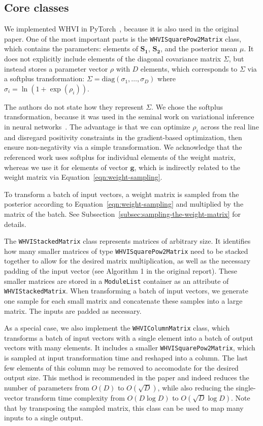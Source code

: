 \documentclass[11pt, twocolumn]{article}
\begin{document}
    \subsection{Core classes}\label{subsec:core-classes}
    We implemented WHVI in PyTorch~\cite{pytorch}, because it is also used in the original paper.
    One of the most important parts is the \texttt{WHVISquarePow2Matrix} class, which contains the parameters: elements of $\mathbf{S_1}$, $\mathbf{S_2}$, and the posterior mean $\mu$.
    It does not explicitly include elements of the diagonal covariance matrix $\Sigma$, but instead stores a parameter vector $\rho$ with $D$ elements, which corresponds to $\Sigma$ via a softplus transformation: $\Sigma = \mathrm{diag}(\sigma_1, \dots, \sigma_D)$ where $\sigma_i = \ln(1 + \exp(\rho_i))$.

    The authors do not state how they represent $\Sigma$.
    We chose the softplus transformation, because it was used in the seminal work on variational inference in neural networks~\cite{blundell2015weight}.
    The advantage is that we can optimize $\rho_i$ across the real line and disregard positivity constraints in the gradient-based optimization, then ensure non-negativity via a simple transformation.
    We acknowledge that the referenced work uses softplus for individual elements of the weight matrix, whereas we use it for elements of vector $\mathbf{g}$, which is indirectly related to the weight matrix via Equation~\ref{eqn:weight-sampling}.

    To transform a batch of input vectors, a weight matrix is sampled from the posterior according to Equation~\ref{eqn:weight-sampling} and multiplied by the matrix of the batch. See Subsection~\ref{subsec:sampling-the-weight-matrix} for details.

    The \texttt{WHVIStackedMatrix} class represents matrices of arbitrary size.
    It identifies how many smaller matrices of type \texttt{WHVISquarePow2Matrix} need to be stacked together to allow for the desired matrix multiplication, as well as the necessary padding of the input vector (see Algorithm 1 in the original report).
    These smaller matrices are stored in a \texttt{ModuleList} container as an attribute of \texttt{WHVIStackedMatrix}. When transforming a batch of input vectors, we generate one sample for each small matrix and concatenate these samples into a large matrix. The inputs are padded as necessary.

    As a special case, we also implement the \texttt{WHVIColumnMatrix} class, which transforms a batch of input vectors with a single element into a batch of output vectors with many elements.
    It includes a smaller \texttt{WHVISquarePow2Matrix}, which is sampled at input transformation time and reshaped into a column.
    The last few elements of this column may be removed to accomodate for the desired output size.
    This method is recommended in the paper and indeed reduces the number of parameters from $O(D)$ to $O(\sqrt{D})$, while also reducing the single-vector transform time complexity from $O(D\log D)$ to $O(\sqrt{D}\log D)$.
    Note that by transposing the sampled matrix, this class can be used to map many inputs to a single output.
\end{document}
